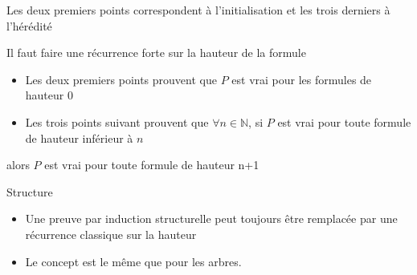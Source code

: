 \begin{rmq}
    Les deux premiers points correspondent à l'initialisation et les trois derniers à l'hérédité
\end{rmq}

\begin{dem}
    Il faut faire une récurrence forte sur la hauteur de la formule
    \begin{itemize}
        \item Les deux premiers points prouvent que $P$ est vrai pour les formules de hauteur $0$
        \item Les trois points suivant prouvent que $\forall n \in \mathbb{N}$, si $P$ est vrai pour toute formule de hauteur inférieur à $n$
    \end{itemize}
    alors $P$ est vrai pour toute formule de hauteur n+1
\end{dem}

\begin{rmq} Structure\\ 
    \begin{itemize} \\
        \item Une preuve par induction structurelle peut toujours être remplacée par une récurrence classique sur la hauteur
        \item Le concept est le même que pour les arbres.
    \end{itemize}
\end{rmq}
\newpage

